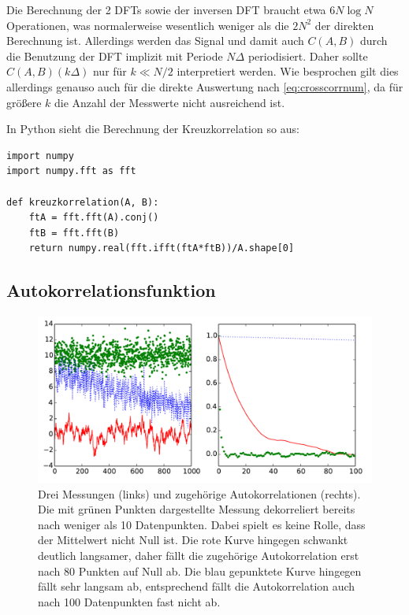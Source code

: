 Die Berechnung der 2 DFTs sowie der inversen DFT braucht etwa $6 N\log
N$ Operationen, was normalerweise wesentlich weniger als die $2N^2$
der direkten Berechnung ist.  Allerdings werden das Signal und damit
auch $C(A,B)$ durch die Benutzung der DFT implizit mit Periode
$N\Delta$ periodisiert. Daher sollte $C(A,B)(k\Delta)$ nur für $k\ll
N/2$ interpretiert werden. Wie besprochen gilt dies allerdings genauso
auch für die direkte Auswertung nach \eqref{eq:crosscorrnum}, da für
größere $k$ die Anzahl der Messwerte nicht ausreichend ist.

In Python sieht die Berechnung der Kreuzkorrelation so aus:
\begin{lstlisting}
import numpy
import numpy.fft as fft

def kreuzkorrelation(A, B):
    ftA = fft.fft(A).conj()
    ftB = fft.fft(B)
    return numpy.real(fft.ifft(ftA*ftB))/A.shape[0]
\end{lstlisting}

\subsection{Autokorrelationsfunktion}

\begin{figure}
  \centering
  \includegraphics[width=\textwidth]{plots/autokorrelation}
  \caption{Drei Messungen (links) und zugehörige Autokorrelationen (rechts).
  Die mit grünen Punkten dargestellte Messung
  dekorreliert bereits nach weniger als 10 Datenpunkten. Dabei spielt es
  keine Rolle, dass der Mittelwert nicht Null ist. Die rote Kurve hingegen
  schwankt deutlich langsamer, daher fällt die zugehörige Autokorrelation 
  erst nach 80 Punkten auf Null ab. Die blau gepunktete Kurve hingegen
  fällt sehr langsam ab, entsprechend fällt die Autokorrelation auch nach 100
  Datenpunkten fast nicht ab.}
  \label{fig:acfs}
\end{figure}

